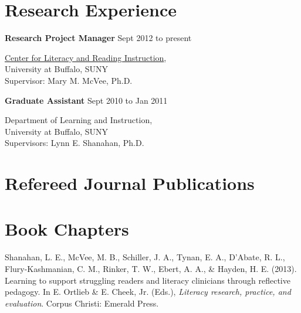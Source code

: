 \section{Research Experience}

\textbf{Research Project Manager} \hfill {Sept 2012 to present}
\begin{innerlist}

\item[] \href{http://clari.buffalo.edu}{Center for Literacy and Reading Instruction},\\
        University at Buffalo, SUNY\\
        Supervisor: Mary M. McVee, Ph.D.
\end{innerlist}

\textbf{Graduate Assistant} \hfill {Sept 2010 to Jan 2011}
\begin{innerlist}

\item[] Department of Learning and Instruction,\\
        University at Buffalo, SUNY\\
        Supervisors: Lynn E. Shanahan, Ph.D.
\end{innerlist}

\section{Refereed Journal Publications}
\vspace{-.1275in}
\begin{bibsection}
    \item
\end{bibsection}
\halfblankline

\section{Book Chapters}
\vspace{-.1275in}
\begin{bibsection}
    \item Shanahan, L. E., McVee, M. B., Schiller, J. A., Tynan, E. A., D'Abate, R. L., Flury-Kashmanian, C. M., Rinker, T. W., Ebert, A. A., \& Hayden, H. E. (2013). Learning to support struggling readers and literacy clinicians through reflective pedagogy. In E. Ortlieb \& E. Cheek, Jr. (Eds.), \emph{Literacy research, practice, and evaluation}. Corpus Christi: Emerald Press.
\end{bibsection}


